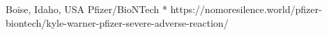          {
            Boise, Idaho, USA
          }
          {
          }
          {
            Pfizer/BioNTech
          }
          {
            *
          }
          {
          }
          {
            https://nomoresilence.world/pfizer-biontech/kyle-warner-pfizer-severe-adverse-reaction/
          }

